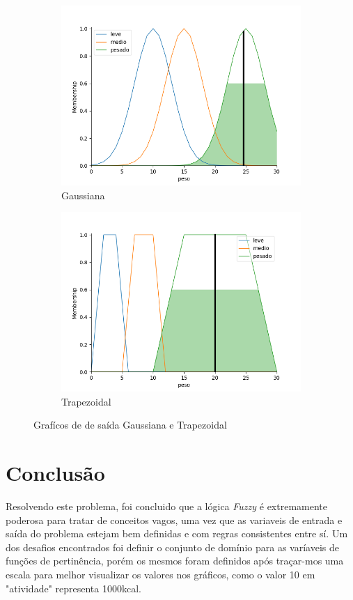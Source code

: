 \documentclass{article}
\begin{document}
\begin{figure}[h!]
  \centering
  \begin{subfigure}[b]{0.4\linewidth}
    \includegraphics[width=\linewidth]{./images/peso-pesado-gauss.png}
    \caption{Gaussiana}
  \end{subfigure}
  \begin{subfigure}[b]{0.4\linewidth}
    \includegraphics[width=\linewidth]{./images/peso-pesado.png}
    \caption{Trapezoidal}
  \end{subfigure}
  \caption{Grafícos de de saída Gaussiana e Trapezoidal}
  \label{fig:saida-2}
\end{figure}

\section{Conclusão}

Resolvendo este problema, foi concluido que a lógica \textit{Fuzzy} é extremamente poderosa para tratar de conceitos vagos, uma vez que as variaveis de entrada e saída do problema estejam bem definidas e com regras consistentes entre sí. Um dos desafios encontrados foi definir o conjunto de domínio para as varíaveis de funções de pertinência, porém os mesmos foram definidos após traçar-mos uma escala para melhor visualizar os valores nos gráficos, como o valor 10 em "atividade" representa 1000kcal.
\end{document}
